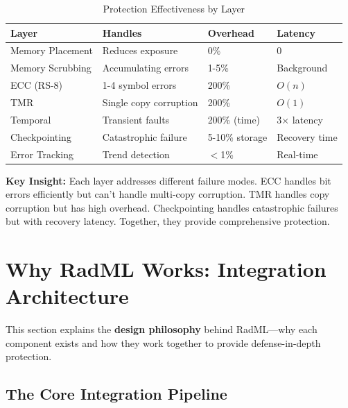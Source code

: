 \documentclass[11pt,a4paper]{article}
\begin{document}
\begin{table}[htbp]
\centering
\caption{Protection Effectiveness by Layer}
\begin{tabular}{@{}llll@{}}
\toprule
\textbf{Layer} & \textbf{Handles} & \textbf{Overhead} & \textbf{Latency} \\
\midrule
Memory Placement & Reduces exposure & 0\% & 0 \\
Memory Scrubbing & Accumulating errors & 1-5\% & Background \\
ECC (RS-8) & 1-4 symbol errors & 200\% & $O(n)$ \\
TMR & Single copy corruption & 200\% & $O(1)$ \\
Temporal & Transient faults & 200\% (time) & 3$\times$ latency \\
Checkpointing & Catastrophic failure & 5-10\% storage & Recovery time \\
Error Tracking & Trend detection & $<$1\% & Real-time \\
\bottomrule
\end{tabular}
\end{table}

\textbf{Key Insight:} Each layer addresses different failure modes. ECC handles bit errors efficiently but can't handle multi-copy corruption. TMR handles copy corruption but has high overhead. Checkpointing handles catastrophic failures but with recovery latency. Together, they provide comprehensive protection.

\section{Why RadML Works: Integration Architecture}

This section explains the \textbf{design philosophy} behind RadML---why each component exists and how they work together to provide defense-in-depth protection.

\subsection{The Core Integration Pipeline}
\end{document}

